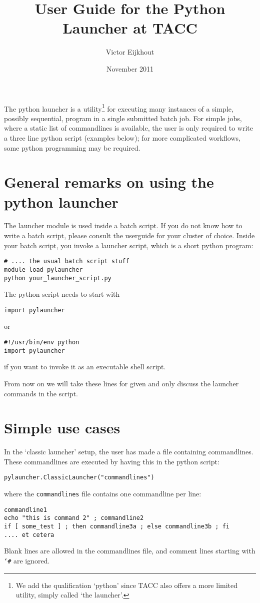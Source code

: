\documentclass[11pt]{artikel3}
\newcommand\n[1]{{\tt #1}}
\begin{document}
\title{User Guide for the Python Launcher at TACC}
\author{Victor Eijkhout}
\date{November 2011}
\maketitle

The python launcher is a utility\footnote{We add the qualification
  `python' since TACC also offers a more limited utility, simply
  called `the launcher'.} for executing many instances of a
simple, possibly sequential, program in a single submitted batch
job. For simple jobs, where a static list of commandlines is
available, the user is only required to write a three line python
script (examples below); for more complicated workflows, some python
programming may be required.

\section*{General remarks on using the python launcher}

The launcher module is used inside a batch script. If you do not know
how to write a batch script, please consult the userguide for your
cluster of choice. Inside your batch script, you invoke a launcher
script, which is a short python program:
\begin{verbatim}
# .... the usual batch script stuff
module load pylauncher
python your_launcher_script.py
\end{verbatim}
The python script needs to start with
\begin{verbatim}
import pylauncher
\end{verbatim}
or 
\begin{verbatim}
#!/usr/bin/env python
import pylauncher
\end{verbatim}
if you want to invoke it as an executable shell script.

From now on we will take these lines for given and only discuss the
launcher commands in the script.

\section*{Simple use cases}

In the `classic launcher' setup, the user has made a file containing
commandlines. These commandlines are executed by having this in the
python script:
\begin{verbatim}
pylauncher.ClassicLauncher("commandlines")
\end{verbatim}
where the \n{commandlines} file contains one commandline per line:
\begin{verbatim}
commandline1
echo "this is command 2" ; commandline2
if [ some_test ] ; then commandline3a ; else commandline3b ; fi
.... et cetera
\end{verbatim}
Blank lines are allowed in the commandlines file, and comment lines
starting with \n{\char`\#} are ignored.
\end{document}
